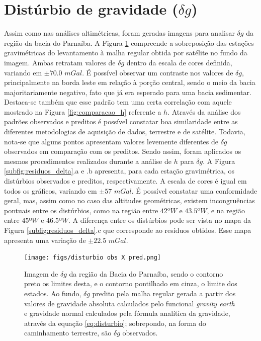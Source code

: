 \section{Distúrbio de gravidade ($\delta g$)}

Assim como nas análises altimétricas, foram geradas imagens para analisar $\delta g$ da região da bacia do Parnaíba. A Figura \ref{fig:comparacao_delta} compreende a sobreposição das estações gravimétricas do levantamento à malha regular obtida por satélite no fundo da imagem. Ambas retratam valores de $\delta g$ dentro da escala de cores definida, variando em $\pm70.0$ $mGal$. É possível observar um contraste nos valores de $\delta g$, principalmente na borda leste em relação à porção central, sendo o meio da bacia majoritariamente negativo, fato que já era esperado para uma bacia sedimentar. Destaca-se também que esse padrão tem uma certa correlação com aquele mostrado na Figura \ref{fig:comparacao_h} referente a $h$. Através da análise dos padrões observados e preditos é possível constatar boa similaridade entre as diferentes metodologias de aquisição de dados, terrestre e de satélite. Todavia, nota-se que alguns pontos apresentam valores levemente diferentes de $\delta g$ observados em comparação com os preditos. Sendo assim, foram aplicados os mesmos procedimentos realizados durante a análise de $h$ para $\delta g$. A Figura \ref{subfig:residuos_delta}.a e .b apresenta, para cada estação gravimétrica, os distúrbios observados e preditos, respectivamente. A escala de cores é igual em todos os gráficos, variando em $\pm57$ $mGal$. É possível constatar uma conformidade geral, mas, assim como no caso das altitudes geométricas, existem incongruências pontuais entre os distúrbios, como na região entre $42$º$W$ e $43.5$º$W$, e na região entre $45$º$W$ e $46.5$º$W$. A diferença entre os distúrbios pode ser vista no mapa da Figura \ref{subfig:residuos_delta}.c que corresponde ao resíduos obtidos. Esse mapa apresenta uma variação de $\pm 22.5$ $mGal$. 


\begin{figure}[H]
	\centering
	\texttt{[image: figs/disturbio obs X pred.png]}
	\caption{Imagem de $\delta g$ da região da Bacia do Parnaíba, sendo o contorno preto os limites desta, e o contorno pontilhado em cinza, o limite dos estados. Ao fundo, $\delta g$ predito pela malha regular gerada a partir dos valores de gravidade absoluta calculados pelo funcional \textit{gravity earth} e gravidade normal calculados pela fórmula analítica da gravidade, através da equação \ref{eq:disturbio}; sobrepondo, na forma do caminhamento terrestre, são $\delta g$ observados.}
	\label{fig:comparacao_delta}
\end{figure}


